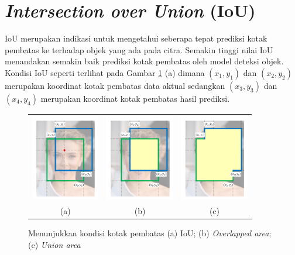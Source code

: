 \section{\textit{Intersection over Union} (IoU)}
IoU merupakan indikasi untuk mengetahui seberapa tepat prediksi kotak pembatas ke terhadap objek yang ada pada citra. Semakin tinggi nilai IoU menandakan semakin baik prediksi kotak pembatas oleh model deteksi objek. Kondisi IoU seperti terlihat pada Gambar \ref{fig:iou-cond} (a) dimana $(x_1, y_1)$ dan $(x_2, y_2)$ merupakan koordinat kotak pembatas data aktual sedangkan $(x_3, y_3)$ dan $(x_4, y_4)$ merupakan koordinat kotak pembatas hasil prediksi.

\begin{figure}[H]
    \centering
    \begin{tabular}{ccc}
        \includegraphics[width=3cm]{../img/IoU Bounding Box - Latex.png}
        &
        \includegraphics[width=3cm]{../img/IoU Overlapped Area - Latex.png}
        &
        \includegraphics[width=3cm]{../img/IoU Union Area - Latex.png}\\
        (a) &(b) &(c)\\
    \end{tabular}
    \caption{Menunjukkan kondisi kotak pembatas (a) IoU; (b) \textit{Overlapped area}; (c) \textit{Union area}}
    \label{fig:iou-cond}
\end{figure}


